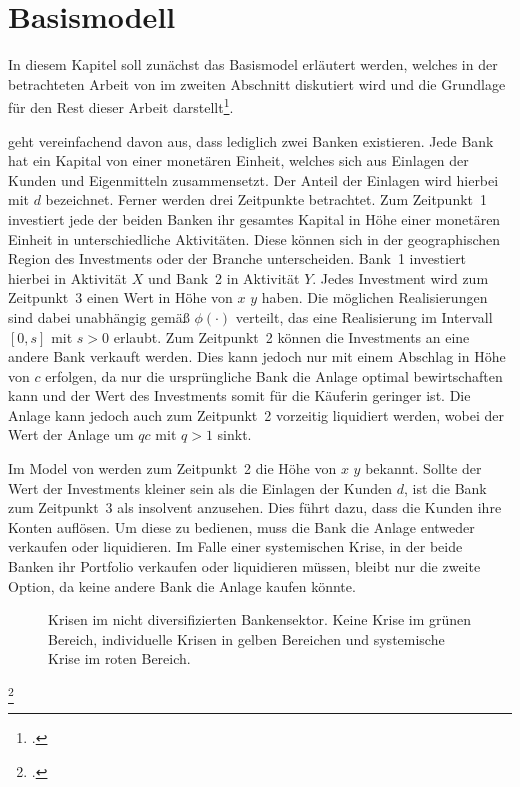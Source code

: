 
\chapter{Basismodell}%
\label{chap:basic}

In diesem Kapitel soll zunächst das Basismodel erläutert werden, welches in der betrachteten Arbeit von \citeauthor{Wagner-2010} im zweiten Abschnitt diskutiert wird und die Grundlage für den Rest dieser Arbeit darstellt\footcite[\ppno~375--377(3--5)]{Wagner-2010}.

 geht vereinfachend davon aus, dass lediglich zwei Banken existieren. Jede Bank hat ein Kapital von einer monetären Einheit, welches sich aus Einlagen der Kunden und Eigenmitteln zusammensetzt. Der Anteil der Einlagen wird hierbei mit $d$ bezeichnet. Ferner werden drei Zeitpunkte betrachtet. Zum Zeitpunkt~1 investiert jede der beiden Banken ihr gesamtes Kapital in Höhe einer monetären Einheit in unterschiedliche Aktivitäten. Diese können sich \zb in der geographischen Region des Investments oder der Branche unterscheiden. Bank~1 investiert hierbei in Aktivität $X$ und Bank~2 in Aktivität $Y$. Jedes Investment wird zum Zeitpunkt~3 einen Wert in Höhe von $x$ \bzw{} $y$ haben. Die möglichen Realisierungen sind dabei unabhängig gemäß $\phi(\cdot)$ verteilt, das eine Realisierung im Intervall $[0,s]$ mit $s\!>\!0$ erlaubt. Zum Zeitpunkt~2 können die Investments an eine andere Bank verkauft werden. Dies kann jedoch nur mit einem Abschlag in Höhe von $c$ erfolgen, da nur die ursprüngliche Bank die Anlage optimal bewirtschaften kann und der Wert des Investments somit für die Käuferin geringer ist. Die Anlage kann jedoch auch zum Zeitpunkt~2 vorzeitig liquidiert werden, wobei der Wert der Anlage um $qc$ mit $q\!>\!1$ sinkt.

Im Model von \citeauthor{Wagner-2010} werden zum Zeitpunkt~2 die Höhe von $x$ \bzw $y$ bekannt. Sollte der Wert der Investments kleiner sein als die Einlagen der Kunden $d$, ist die Bank zum Zeitpunkt~3 als insolvent anzusehen. Dies führt dazu, dass die Kunden ihre Konten auflösen. Um diese zu bedienen, muss die Bank die Anlage entweder verkaufen oder liquidieren. Im Falle einer systemischen Krise, in der beide Banken ihr Portfolio verkaufen oder liquidieren müssen, bleibt nur die zweite Option, da keine andere Bank die Anlage kaufen könnte.

\begin{figure}[t!]\centering
	\caption[Krisen im nicht diversifizierten Bankensektor.]{Krisen im nicht diversifizierten Bankensektor\footnotemark. Keine Krise im grünen Bereich, individuelle Krisen in gelben Bereichen und systemische Krise im roten Bereich.}%
	\label{fig:basic}
\end{figure}
\footcitetext[nach][\pno~376(4), Fig.~1]{Wagner-2010}

